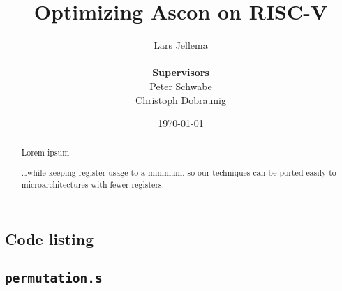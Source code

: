 \documentclass{article}
\title{Optimizing Ascon on RISC-V}
\author{Lars Jellema \\\\
    \textbf{\small Supervisors} \\
    \small Peter Schwabe \\
    \small Christoph Dobraunig}
\date{\today}
\begin{document}
\maketitle

\begin{abstract}
Lorem ipsum

\dots while keeping register usage to a minimum, so our techniques can be ported
easily to microarchitectures with fewer registers.

\end{abstract}

\clearpage










\begin{appendices}



\section{Code listing}

\subsection{\texttt{permutation.s}}



\end{appendices}
\end{document}

